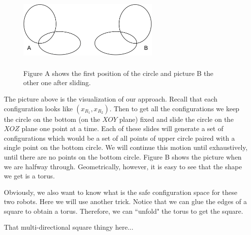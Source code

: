 \documentclass[12pt]{article}
\theoremstyle{definition}
\begin{document}
\begin{figure}[H]
    \centering
    \includegraphics[width=7cm, height=4cm]{two-circles}
    \caption*{Figure A shows the first position of the circle and picture B the other one after sliding.}
\end{figure}

The picture above is the visualization of our approach. Recall that each configuration looks like $(x_{R_1}, x_{R_2})$.
Then to get all the configurations we keep the circle on the bottom (on the $XOY$ plane) fixed and slide the circle
on the $XOZ$ plane one point at a time. Each of these slides will generate a set of configurations which would be a set
of all points of upper circle paired with a single point on the bottom circle. We will continue this motion until exhaustively,
until there are no points on the bottom circle. Figure B shows the picture when we are halfway through. Geometrically,
however, it is easy to see that the shape we get is a torus.

\bigskip

Obviously, we also want to know what is the safe configuration space for these two robots.
Here we will use another trick. Notice that we can glue the edges of a square to obtain a torus.
Therefore, we can ``unfold" the torus to get the square.

That multi-directional square thingy here...

\end{document}
